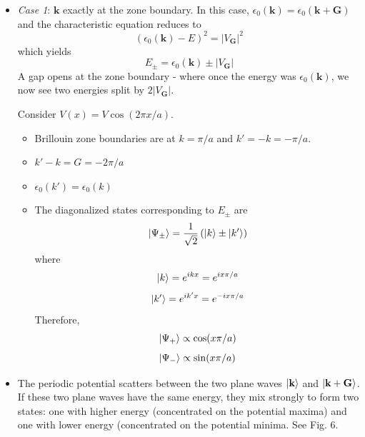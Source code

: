\documentclass[10pt]{article}
\begin{document}
\begin{itemize}
  \item \emph{Case 1}: $\textbf{k}$ exactly at the zone boundary.
    In this case, $\epsilon_{0}(\textbf{k}) = \epsilon_{0}(\textbf{k} + \textbf{G})$ and the characteristic equation
    reduces to
    $$\left ( \epsilon_{0}(\textbf{k}) - E \right)^{2} = |V_{\textbf{G}}|^{2} $$
    which yields
    $$E_{\pm} = \epsilon_{0}(\textbf{k})\pm|V_{\textbf{G}}|$$
    A gap opens at the zone boundary - where once the energy was $\epsilon_{0}(\textbf{k})$, we now see two energies split by $2|V_{\textbf{G}}|$.

    Consider $V(x) = V\cos(2\pi x/a)$.
    \begin{itemize}
      \item Brillouin zone boundaries are at $k = \pi/a$ and $k' = -k = -\pi/a$.
      \item $k' - k = G = -2\pi/a$
      \item $\epsilon_{0}(k') = \epsilon_{0}(k)$
      \item The diagonalized states corresponding to $E_{\pm}$ are
      $$\ket{\Psi_{\pm}} = \frac{1}{\sqrt{2}}\left ( \ket{k} \pm \ket{k'}\right )$$
      where
      $$\ket{k} = e^{ikx} = e^{ix\pi/a}$$
      $$\ket{k'} = e^{ik'x} = e^{-ix\pi/a}$$
      Therefore,
      $$\ket{\Psi_{+}} \propto \cos(x\pi/a)$$
      $$\ket{\Psi_{-}} \propto \sin(x\pi/a)$$
    \end{itemize}
    \item The periodic potential scatters between the two plane waves $\ket{\textbf{k}}$ and $\ket{\textbf{k} + \textbf{G}}$. If these two
    plane waves have the same energy, they mix strongly to form two states: one with higher energy (concentrated on the potential maxima) and
    one with lower energy (concentrated on the potential minima. See Fig. 6.


\end{itemize}
\end{document}
